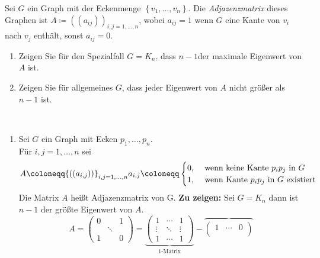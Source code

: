 \begin{assignment}
 Sei $ G $ ein Graph mit der Eckenmenge $\left\{ v_1, \dots, v_n \right\}$. Die \emph{Adjazenzmatrix} dieses Graphen ist $A \coloneqq ((a_{ ij }))_{ i,j = 1, \dots, n }$, wobei $a_{ ij } = 1$ wenn $ G $ eine Kante von $ v_i $ nach $v_j$ enthält, sonst $a_{ ij } = 0$.
 \begin{enumerate}[label=(\alph*)] 
    \item Zeigen Sie für den Spezialfall $ G = K_n $, dass $ n-1 $der maximale Eigenwert von $ A $ ist.
    \item Zeigen Sie für allgemeines $ G $, dass jeder Eigenwert von $ A $ nicht größer als $ n - 1 $ ist.
 \end{enumerate}
\end{assignment}
\begin{solution}
\
 \begin{enumerate}[label=(\alph*)] 
    \item    Sei \( G \) ein Graph mit Ecken \( p_1, \dots , p_n \). \\
  Für \( i,j = 1, \dots , n \) sei 
  \begin{equation*}
    A \coloneqq {((a_{i,j}))}_{i,j = 1,\dots, n} \\
    a_{i,j} \coloneqq 
    \begin{cases}
      0\text{,} &\text{ wenn keine Kante \( p_i p_j \) in \( G \)} \\
      1\text{,} &\text{ wenn Kante \( p_i p_j \) in \( G \) existiert}
    \end{cases}
  \end{equation*}
  Die Matrix \( A \) heißt Adjazenzmatrix von G.
  \textbf{Zu zeigen:} Sei \( G = K_n \) dann ist \( n-1 \) der größte Eigenwert von \( A \). \\
  \begin{equation*}
    A = \begin{pmatrix}
      0 & & 1 \\
      &\ddots & \\
      1 & & 0
    \end{pmatrix} = 
    \underbrace{\begin{pmatrix}
      1 & \cdots & 1 \\
      \vdots & \ddots & \vdots \\
      1 & \cdots & 1
    \end{pmatrix}}_\text{1-Matrix}
    -
    \overbrace{\begin{pmatrix}
      1 & \cdots & 0 \\

\end{pmatrix}}
\end{equation*}
\end{enumerate}
\end{solution}
